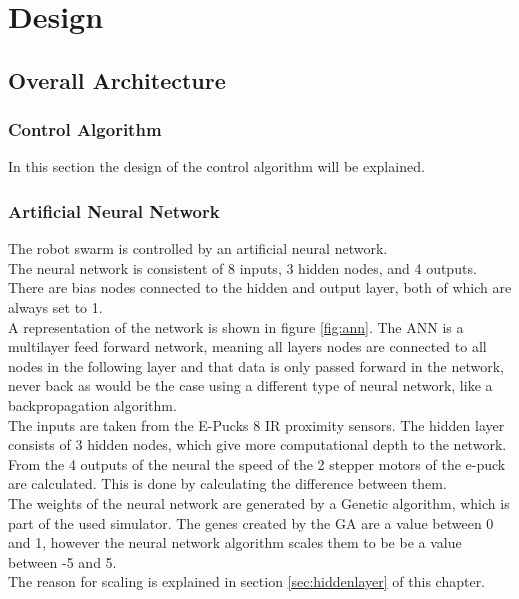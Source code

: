 \chapter{Design}

\section{Overall Architecture}
\subsection{Control Algorithm}
In this section the design of the control algorithm will be explained.

\subsection{Artificial Neural Network}
The robot swarm is controlled by an artificial neural network. \\
The neural network is consistent of 8 inputs, 3 hidden nodes, and 4 outputs. \\
There are bias nodes connected to the hidden and output layer, both of which are always set to 1. \\
A representation of the network is shown in figure \ref{fig:ann}. 
The ANN is a multilayer feed forward network, meaning all layers nodes are connected to all nodes in the following layer and that data is only passed forward in the network, never back as would be the case using a different type of neural network, like a backpropagation algorithm. \\

The inputs are taken from the E-Pucks 8 IR proximity sensors. The hidden layer consists of 3 hidden nodes, which give more computational depth to the network. \\
From the 4 outputs of the neural the speed of the 2 stepper motors of the e-puck are calculated. This is done by calculating the difference between them. \\
The weights of the neural network are generated by a Genetic algorithm, which is part of the used simulator. The genes created by the GA are a value between 0 and 1, however the neural network algorithm scales them to be be a value between -5 and 5.\\ 
The reason for scaling is explained in section \ref{sec:hiddenlayer} of this chapter.\\

